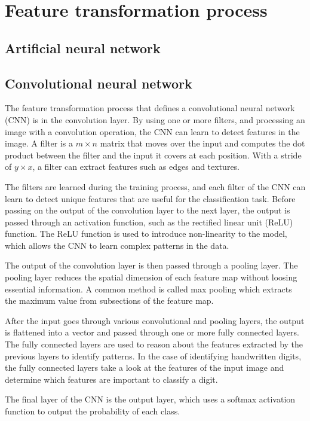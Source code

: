 \section{Feature transformation process}

\subsection{Artificial neural network}

\subsection{Convolutional neural network}

The feature transformation process that defines a convolutional neural network (CNN) is in the convolution layer. By using one or more filters, and processing an image with a convolution operation, the CNN can learn to detect features in the image. A filter is a $m \times n$ matrix that moves over the input and computes the dot product between the filter and the input it covers at each position. With a stride of $y \times x$, a filter can extract features such as edges and textures. 
\par
The filters are learned during the training process, and each filter of the CNN can learn to detect unique features that are useful for the classification task. Before passing on the output of the convolution layer to the next layer, the output is passed through an activation function, such as the rectified linear unit (ReLU) function. The ReLU function is used to introduce non-linearity to the model, which allows the CNN to learn complex patterns in the data.
\par
The output of the convolution layer is then passed through a pooling layer. The pooling layer reduces the spatial dimension of each feature map without loosing essential information. A common method is called max pooling which extracts the maximum value from subsections of the feature map.
\par
After the input goes through various convolutional and pooling layers, the output is flattened into a vector and passed through one or more fully connected layers. The fully connected layers are used to reason about the features extracted by the previous layers to identify patterns. In the case of identifying handwritten digits, the fully connected layers take a look at the features of the input image and determine which features are important to classify a digit. 
\par
The final layer of the CNN is the output layer, which uses a softmax activation function to output the probability of each class. 